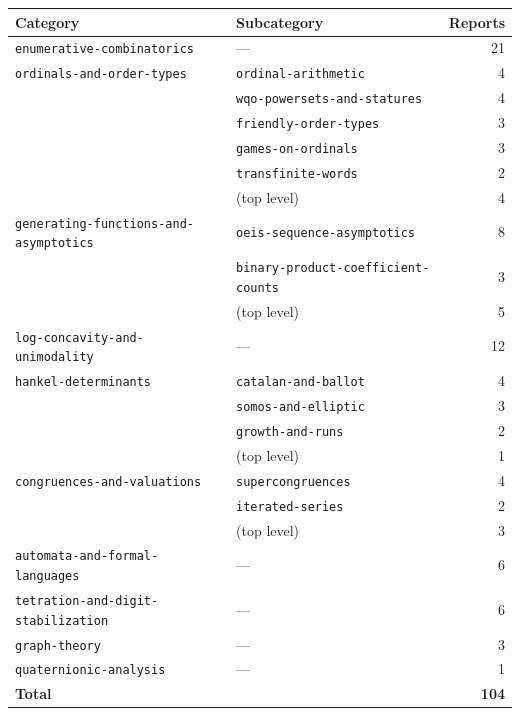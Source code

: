 \documentclass[11pt]{article}
\newcommand{\dir}[1]{\texttt{#1}}
\begin{document}
\begin{center}
\begin{tabular}{@{}llr@{}}
\toprule
\textbf{Category} & \textbf{Subcategory} & \textbf{Reports}\\
\midrule
\dir{enumerative-combinatorics} & --- & 21\\
\midrule
\dir{ordinals-and-order-types} & \dir{ordinal-arithmetic} & 4\\
 & \dir{wqo-powersets-and-statures} & 4\\
 & \dir{friendly-order-types} & 3\\
 & \dir{games-on-ordinals} & 3\\
 & \dir{transfinite-words} & 2\\
 & (top level) & 4\\
\midrule
\dir{generating-functions-and-asymptotics} & \dir{oeis-sequence-asymptotics} & 8\\
 & \dir{binary-product-coefficient-counts} & 3\\
 & (top level) & 5\\
\midrule
\dir{log-concavity-and-unimodality} & --- & 12\\
\midrule
\dir{hankel-determinants} & \dir{catalan-and-ballot} & 4\\
 & \dir{somos-and-elliptic} & 3\\
 & \dir{growth-and-runs} & 2\\
 & (top level) & 1\\
\midrule
\dir{congruences-and-valuations} & \dir{supercongruences} & 4\\
 & \dir{iterated-series} & 2\\
 & (top level) & 3\\
\midrule
\dir{automata-and-formal-languages} & --- & 6\\
\midrule
\dir{tetration-and-digit-stabilization} & --- & 6\\
\midrule
\dir{graph-theory} & --- & 3\\
\midrule
\dir{quaternionic-analysis} & --- & 1\\
\midrule
\multicolumn{2}{l}{\textbf{Total}} & \textbf{104}\\
\bottomrule
\end{tabular}
\end{center}
\end{document}
